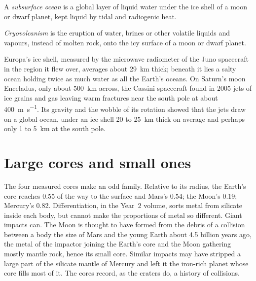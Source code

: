 \begin{definition}\label{def:b3:planetary-interiors-surfaces:ocean-world}
A \emph{subsurface ocean} is a global layer of
liquid water under the ice shell of a moon or dwarf planet, kept liquid by
tidal and radiogenic heat.
\end{definition}

\begin{definition}[Cryovolcanism]\label{def:b3:planetary-interiors-surfaces:cryovolcanism}
\emph{Cryovolcanism} is the eruption of water, brines
or other volatile liquids and vapours, instead of molten rock, onto the
icy surface of a moon or dwarf planet.
\end{definition}

Europa's ice shell, measured by the microwave radiometer of the Juno
spacecraft in the region it flew over, averages about \qty{29}{km} thick;
beneath it lies a salty ocean holding twice as much water as all the
Earth's oceans. On Saturn's moon Enceladus, only about \qty{500}{km}
across, the Cassini spacecraft found in 2005 jets of ice grains and gas
leaving warm fractures near the south pole at about
\qty{400}{m.s^{-1}}. Its gravity and the wobble of its rotation showed
that the jets draw on a global ocean, under an ice shell 20 to
\qty{25}{km} thick on average and perhaps only 1 to \qty{5}{km} at the
south pole.

\section{Large cores and small ones}\label{sec:b3:planetary-interiors-surfaces:cores}

The four measured cores make an odd family. Relative to its radius, the
Earth's core reaches 0.55 of the way to the surface and Mars's 0.54; the
Moon's 0.19; Mercury's 0.82. Differentiation, in the Year~2 volume, sorts
metal from silicate inside each body, but cannot make the proportions of
metal so different. Giant impacts can. The Moon is thought to have formed
from the debris of a collision between a body the size of Mars and the
young Earth about 4.5 billion years ago, the metal of the impactor joining
the Earth's core and the Moon gathering mostly mantle rock, hence its
small core. Similar impacts may have stripped a large part of the silicate
mantle of Mercury and left it the iron-rich planet whose core fills most
of it. The cores record, as the craters do, a history of collisions.

